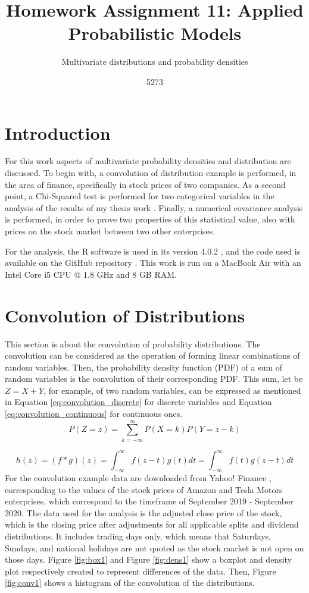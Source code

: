 \documentclass[10pt,leter,openany]{article}
\author{5273}
\title{Homework Assignment 11: Applied Probabilistic Models}
\subtitle{Multivariate distributions and probability densities}
\date{}
\begin{document}
	
\maketitle

\section{Introduction}
 	For this work aspects of multivariate probability densities and distribution are discussed. To begin with, a convolution of distribution example is performed, in the area of finance, specifically in stock prices of two companies. As a second point, a Chi-Squared test is performed for two categorical variables in the analysis of the results of my thesis work \citep{hernandez2020study}. Finally, a numerical covariance analysis is performed, in order to prove two properties of this statistical value, also with prices on the stock market between two other enterprises.
 	
 	For the analysis, the R software is used in its version 4.0.2 \citep{r}, and the code used is available on the GitHub repository \citep{github}. This work is run on a MacBook Air with an Intel Core i5 CPU $ @ $ 1.8 GHz and 8 GB RAM.

\section{Convolution of Distributions}
	 This section is about the convolution of probability distributions. The convolution can be considered as the operation of forming linear combinations of random variables. Then, the probability density function (PDF) of a sum of random variables is the convolution of their corresponding PDF. This sum, let be $ Z = X + Y$, for example, of two random variables, can be expressed as mentioned in Equation \ref{eq:convolution_discrete} for discrete variables and Equation \ref {eq:convolution_continuous} for continuous ones.
		\begin{equation} \label{eq:convolution_discrete}
			P(Z=z) = \displaystyle\sum_{k=-\infty}^{\infty} P(X=k)P(Y=z-k)
		\end{equation}
	
		\begin{equation} \label{eq:convolution_continuous}
			h(z) = (f*g)(z) = \displaystyle \int_{-\infty}^{\infty}f(z-t)g(t)dt = \displaystyle\int_{-\infty}^{\infty}f(t)g(z-t)dt
		\end{equation}
	For the convolution example data are downloaded from Yahoo! Finance \citep{yahoo}, corresponding to the values of the stock prices of Amazon and Tesla Motors enterprises, which correspond to the timeframe of September 2019 - September 2020. The data used for the analysis is the adjusted close price of the stock, which is the closing price after adjustments for all applicable splits and dividend distributions.  It includes trading days only, which means that Saturdays, Sundays, and national holidays are not quoted as the stock market is not open on those days. Figure \ref{fig:box1} and Figure \ref{fig:dens1} show a boxplot and density plot respectively created to represent differences of the data. Then, Figure \ref{fig:conv1} shows a histogram of the convolution of the distributions.
	
\end{document}
